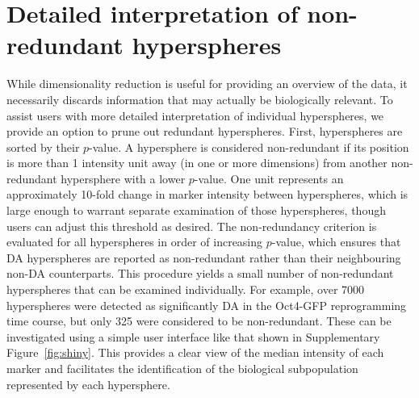 \documentclass{article}
\begin{document}
\section{Detailed interpretation of non-redundant hyperspheres}
While dimensionality reduction is useful for providing an overview of the data, it necessarily discards information that may actually be biologically relevant.
To assist users with more detailed interpretation of individual hyperspheres, we provide an option to prune out redundant hyperspheres.
First, hyperspheres are sorted by their $p$-value.
A hypersphere is considered non-redundant if its position is more than 1 intensity unit away (in one or more dimensions) from another non-redundant hypersphere with a lower $p$-value.
One unit represents an approximately 10-fold change in marker intensity between hyperspheres, which is large enough to warrant separate examination of those hyperspheres, though users can adjust this threshold as desired.
The non-redundancy criterion is evaluated for all hyperspheres in order of increasing $p$-value, which ensures that DA hyperspheres are reported as non-redundant rather than their neighbouring non-DA counterparts.
This procedure yields a small number of non-redundant hyperspheres that can be examined individually.
For example, over 7000 hyperspheres were detected as significantly DA in the Oct4-GFP reprogramming time course, but only 325 were considered to be non-redundant.
These can be investigated using a simple user interface like that shown in Supplementary Figure~\ref{fig:shiny}.
This provides a clear view of the median intensity of each marker and facilitates the identification of the biological subpopulation represented by each hypersphere.
\end{document}
